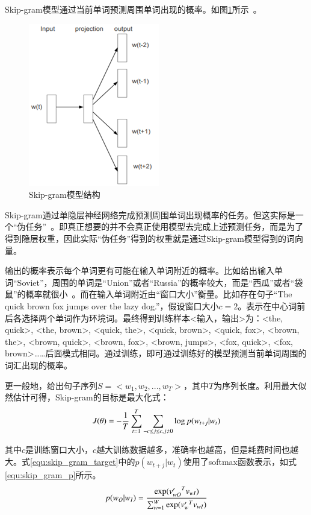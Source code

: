 Skip-gram模型通过当前单词预测周围单词出现的概率。如图\ref{fig:skip_gram_model}所示~。
\begin{figure}
	\centering
	\includegraphics[width=.45\linewidth]{./figures/skip_gram_model.png}
	\caption{Skip-gram模型结构}
	\label{fig:skip_gram_model}
\end{figure}

Skip-gram通过单隐层神经网络完成预测周围单词出现概率的任务。但这实际是一个“伪任务”~。即真正想要的并不会真正使用模型去完成上述预测任务，而是为了得到隐层权重，因此实际“伪任务”得到的权重就是通过Skip-gram模型得到的词向量。

输出的概率表示每个单词更有可能在输入单词附近的概率。比如给出输入单词“Soviet”，周围的单词是“Union”或者“Russia”的概率较大，而是“西瓜”或者“袋鼠”的概率就很小~。而在输入单词附近由“窗口大小”衡量。比如存在句子“The quick brown fox jumps over the lazy dog.”，假设窗口大小$c=2$。表示在中心词前后各选择两个单词作为环境词。最终得到训练样本<输入，输出>为：<the, quick>, <the, brown>, <quick, the>, <quick, brown>, <quick, fox>, <brown, the>, <brown, quick>, <brown, fox>, <brown, jumps>, <fox, quick>, <fox, brown>……后面模式相同。通过训练，即可通过训练好的模型预测当前单词周围的词汇出现的概率。

更一般地，给出句子序列$S=<w_1,w_2,...,w_T>$，其中$T$为序列长度。利用最大似然估计可得，Skip-gram的目标是最大化式：
\begin{equation}
\label{equ:skip_gram_target}
\setlength{\abovedisplayskip}{10pt}
\setlength{\belowdisplayskip}{10pt}
J(\theta)=-\frac{1}{T}\sum_{t=1}^{T}\sum_{-c\leq j\leq c, j\neq 0}\log p(w_{t+j}|w_t)
\end{equation}

其中$c$是训练窗口大小，$c$越大训练数据越多，准确率也越高，但是耗费时间也越大。式\ref{equ:skip_gram_target}中的$p(w_{t+j}|w_t)$使用了softmax函数表示，如式\ref{equ:skip_gram_p}所示。
\begin{equation}
\label{equ:skip_gram_p}
\setlength{\abovedisplayskip}{10pt}
\setlength{\belowdisplayskip}{10pt}
p(w_O|w_I)=\frac{\exp ({v'_{wO}}^{T}v_{wI})}{\sum_{w=1}^{W} \exp ({v'_w}^{T}v_{wI})}
\end{equation}

